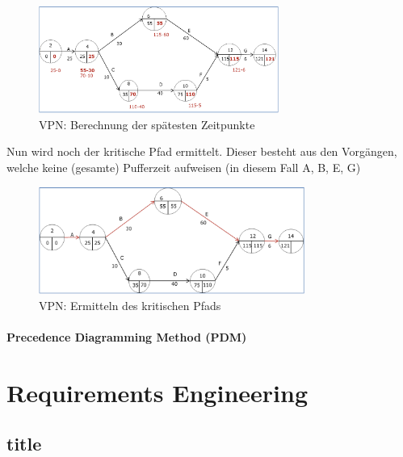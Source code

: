 \documentclass[a4paper]{article}
\begin{document}
			\begin{figure}[!htb]
				\centering
				\includegraphics[height=3.5cm]{img/pm/cpm_latest.png}
				\caption{VPN: Berechnung der spätesten Zeitpunkte}
				\label{fig:pm_cpm_latest}
			\end{figure}
			\noindent
			Nun wird noch der kritische Pfad ermittelt.
			Dieser besteht aus den Vorgängen, welche keine (gesamte) Pufferzeit aufweisen (in diesem Fall A, B, E, G)
			
			\begin{figure}[!htb]
				\centering
				\includegraphics[height=3.5cm]{img/pm/cpm_critical.png}
				\caption{VPN: Ermitteln des kritischen Pfads}
				\label{fig:pm_cpm_critical}
			\end{figure}
		
\newpage

			\paragraph{Precedence Diagramming Method (PDM)}
			
			
			
	
	
				
	\section{Requirements Engineering}
	
		\subsection{title}
		
		
		
		
		
	
	
\end{document}
